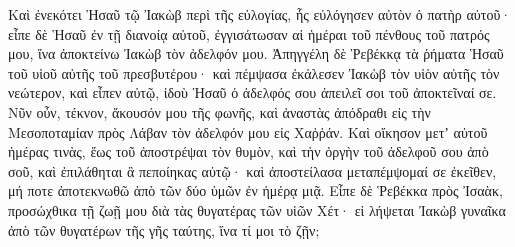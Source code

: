 {\par }{\PP {}Καὶ ἐνεκότει Ἡσαῦ τῷ Ἰακὼβ περὶ τῆς εὐλογίας, ἧς εὐλόγησεν αὐτὸν ὁ πατὴρ αὐτοῦ· εἶπε δὲ Ἡσαῦ ἐν τῇ διανοίᾳ αὐτοῦ, ἐγγισάτωσαν αἱ ἡμέραι τοῦ πένθους τοῦ πατρός μου, ἵνα ἀποκτείνω Ἰακὼβ τὸν ἀδελφόν μου.
Ἀπηγγέλη δὲ Ῥεβέκκᾳ τὰ ῥήματα Ἡσαῦ τοῦ υἱοῦ αὐτῆς τοῦ πρεσβυτέρου· καὶ πέμψασα ἐκάλεσεν Ἰακὼβ τὸν υἱὸν αὐτῆς τὸν νεώτερον, καὶ εἶπεν αὐτῷ, ἰδοὺ Ἡσαῦ ὁ ἀδελφός σου ἀπειλεῖ σοι τοῦ ἀποκτεῖναί σε.
Νῦν οὖν, τέκνον, ἄκουσόν μου τῆς φωνῆς, καὶ ἀναστὰς ἀπόδραθι εἰς τὴν Μεσοποταμίαν πρὸς Λάβαν τὸν ἀδελφόν μου εἰς Χαῤῥάν.
Καὶ οἴκησον μετʼ αὐτοῦ ἡμέρας τινὰς, ἕως τοῦ ἀποστρέψαι τὸν θυμὸν,
καὶ τὴν ὀργὴν τοῦ ἀδελφοῦ σου ἀπὸ σοῦ, καὶ ἐπιλάθηται ἃ πεποίηκας αὐτῷ· καὶ ἀποστείλασα μεταπέμψομαί σε ἐκεῖθεν, μή ποτε ἀποτεκνωθῶ ἀπὸ τῶν δύο ὑμῶν ἐν ἡμέρᾳ μιᾷ.
Εἶπε δὲ Ῥεβέκκα πρὸς Ἰσαὰκ, προσώχθικα τῇ ζωῇ μου διὰ τὰς θυγατέρας τῶν υἱῶν Χέτ· εἰ λήψεται Ἰακὼβ γυναῖκα ἀπὸ τῶν θυγατέρων τῆς γῆς ταύτης, ἵνα τί μοι τὸ ζῇν;

}
